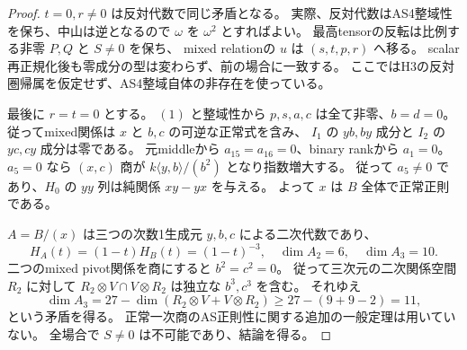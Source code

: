 \begin{proof}
$t=0,r\ne0$ は反対代数で同じ矛盾となる。
実際、反対代数はAS4整域性を保ち、中山は逆となるので $\omega$ を $\omega^2$ とすればよい。
最高tensorの反転は比例する非零 $P,Q$ と $S\ne0$ を保ち、
mixed relationの $u$ は $(s,t,p,r)$ へ移る。
scalar再正規化後も零成分の型は変わらず、前の場合に一致する。
ここではH3の反対圏帰属を仮定せず、AS4整域自体の非存在を使っている。

最後に $r=t=0$ とする。
$(1)$ と整域性から $p,s,a,c$ は全て非零、$b=d=0$。
従ってmixed関係は $x$ と $b,c$ の可逆な正常式を含み、
$I_1$ の $yb,by$ 成分と $I_2$ の $yc,cy$ 成分は零である。
元middleから $a_{15}=a_{16}=0$、binary rankから $a_1=0$。
$a_5=0$ なら $(x,c)$ 商が $k\langle y,b\rangle/(b^2)$ となり指数増大する。
従って $a_5\ne0$ であり、$H_0$ の $yy$ 列は純関係 $xy-yx$ を与える。
よって $x$ は $B$ 全体で正常正則である。

$A=B/(x)$ は三つの次数1生成元 $y,b,c$ による二次代数であり、
\[
 H_A(t)=(1-t)H_B(t)=(1-t)^{-3},\quad\dim A_2=6,\quad\dim A_3=10.
\]
二つのmixed pivot関係を商にすると $b^2=c^2=0$。
従って三次元の二次関係空間 $R_2$ に対して
$R_2\otimes V\cap V\otimes R_2$ は独立な $b^3,c^3$ を含む。
それゆえ
\[
 \dim A_3=27-\dim(R_2\otimes V+V\otimes R_2)
 \ge27-(9+9-2)=11,
\]
という矛盾を得る。
正常一次商のAS正則性に関する追加の一般定理は用いていない。
全場合で $S\ne0$ は不可能であり、結論を得る。
\end{proof}
